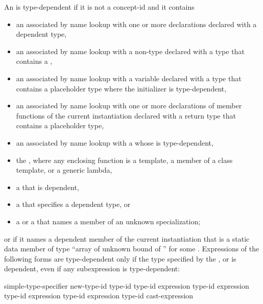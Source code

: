 \pnum
An
is type-dependent if it is not a concept-id and it contains
\begin{itemize}
\item
an
associated by name lookup with one or more declarations
declared with a dependent type,
\item
an
associated by name lookup with
a non-type 
declared with a type
that contains a ,
\item
an
associated by name lookup with
a variable declared with a type that contains a placeholder type
where the initializer is type-dependent,
\item
an  associated by name lookup with one or more
declarations of member functions of the current instantiation declared
with a return type that contains a placeholder type,
\item
an  associated by name lookup with
a  whose
 is type-dependent,
\item
the
, where any enclosing function is a
template, a member of a class template, or a generic lambda,
\item
a
that is dependent,
\item
a
that specifies a dependent type, or
\item
a
or a
that names a member of an unknown specialization;
\end{itemize}
or if it names a dependent member of the current instantiation that is a static
data member of type
``array of unknown bound of '' for some .
Expressions of the following forms are type-dependent only if the type
specified by the
,
or
is dependent, even if any subexpression is type-dependent:

\begin{ncsimplebnf}
simple-type-specifier \terminal{(}  \terminal{)}\br
\opt{\terminal{::}}   new-type-id \br
\opt{\terminal{::}}   \terminal{(} type-id \terminal{)} \br
{} \terminal{<} type-id \terminal{>} \terminal{(} expression \terminal{)}\br
{} \terminal{<} type-id \terminal{>} \terminal{(} expression \terminal{)}\br
{} \terminal{<} type-id \terminal{>} \terminal{(} expression \terminal{)}\br
{} \terminal{<} type-id \terminal{>} \terminal{(} expression \terminal{)}\br
\terminal{(} type-id \terminal{)} cast-expression
\end{ncsimplebnf}

